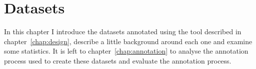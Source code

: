 \chapter{Datasets}
\label{chap:datasets} 

In this chapter I introduce the datasets annotated using the tool described in chapter~\ref{chap:design}, describe a little background around each one and examine some statistics. It is left to chapter~\ref{chap:annotation} to  analyse the annotation process used to create these datasets and evaluate the annotation process.



